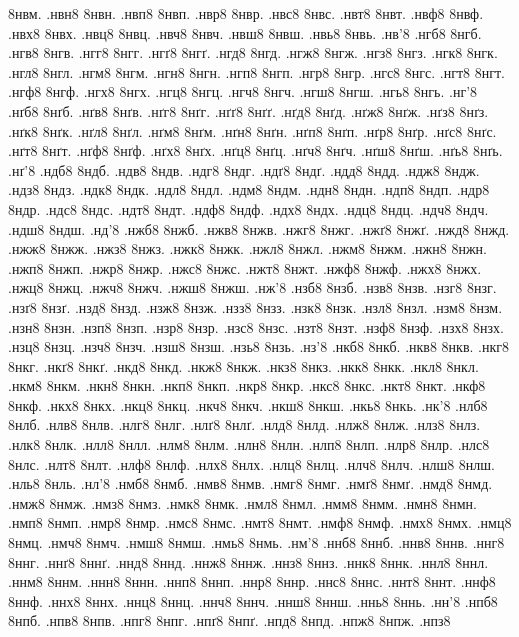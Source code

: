 {8нвм.
.нвн8
8нвн.
.нвп8
8нвп.
.нвр8
8нвр.
.нвс8
8нвс.
.нвт8
8нвт.
.нвф8
8нвф.
.нвх8
8нвх.
.нвц8
8нвц.
.нвч8
8нвч.
.нвш8
8нвш.
.нвь8
8нвь.
.нв'8
.нгб8
8нгб.
.нгв8
8нгв.
.нгг8
8нгг.
.нгґ8
8нгґ.
.нгд8
8нгд.
.нгж8
8нгж.
.нгз8
8нгз.
.нгк8
8нгк.
.нгл8
8нгл.
.нгм8
8нгм.
.нгн8
8нгн.
.нгп8
8нгп.
.нгр8
8нгр.
.нгс8
8нгс.
.нгт8
8нгт.
.нгф8
8нгф.
.нгх8
8нгх.
.нгц8
8нгц.
.нгч8
8нгч.
.нгш8
8нгш.
.нгь8
8нгь.
.нг'8
.нґб8
8нґб.
.нґв8
8нґв.
.нґг8
8нґг.
.нґґ8
8нґґ.
.нґд8
8нґд.
.нґж8
8нґж.
.нґз8
8нґз.
.нґк8
8нґк.
.нґл8
8нґл.
.нґм8
8нґм.
.нґн8
8нґн.
.нґп8
8нґп.
.нґр8
8нґр.
.нґс8
8нґс.
.нґт8
8нґт.
.нґф8
8нґф.
.нґх8
8нґх.
.нґц8
8нґц.
.нґч8
8нґч.
.нґш8
8нґш.
.нґь8
8нґь.
.нґ'8
.ндб8
8ндб.
.ндв8
8ндв.
.ндг8
8ндг.
.ндґ8
8ндґ.
.ндд8
8ндд.
.ндж8
8ндж.
.ндз8
8ндз.
.ндк8
8ндк.
.ндл8
8ндл.
.ндм8
8ндм.
.ндн8
8ндн.
.ндп8
8ндп.
.ндр8
8ндр.
.ндс8
8ндс.
.ндт8
8ндт.
.ндф8
8ндф.
.ндх8
8ндх.
.ндц8
8ндц.
.ндч8
8ндч.
.ндш8
8ндш.
.нд'8
.нжб8
8нжб.
.нжв8
8нжв.
.нжг8
8нжг.
.нжґ8
8нжґ.
.нжд8
8нжд.
.нжж8
8нжж.
.нжз8
8нжз.
.нжк8
8нжк.
.нжл8
8нжл.
.нжм8
8нжм.
.нжн8
8нжн.
.нжп8
8нжп.
.нжр8
8нжр.
.нжс8
8нжс.
.нжт8
8нжт.
.нжф8
8нжф.
.нжх8
8нжх.
.нжц8
8нжц.
.нжч8
8нжч.
.нжш8
8нжш.
.нж'8
.нзб8
8нзб.
.нзв8
8нзв.
.нзг8
8нзг.
.нзґ8
8нзґ.
.нзд8
8нзд.
.нзж8
8нзж.
.нзз8
8нзз.
.нзк8
8нзк.
.нзл8
8нзл.
.нзм8
8нзм.
.нзн8
8нзн.
.нзп8
8нзп.
.нзр8
8нзр.
.нзс8
8нзс.
.нзт8
8нзт.
.нзф8
8нзф.
.нзх8
8нзх.
.нзц8
8нзц.
.нзч8
8нзч.
.нзш8
8нзш.
.нзь8
8нзь.
.нз'8
.нкб8
8нкб.
.нкв8
8нкв.
.нкг8
8нкг.
.нкґ8
8нкґ.
.нкд8
8нкд.
.нкж8
8нкж.
.нкз8
8нкз.
.нкк8
8нкк.
.нкл8
8нкл.
.нкм8
8нкм.
.нкн8
8нкн.
.нкп8
8нкп.
.нкр8
8нкр.
.нкс8
8нкс.
.нкт8
8нкт.
.нкф8
8нкф.
.нкх8
8нкх.
.нкц8
8нкц.
.нкч8
8нкч.
.нкш8
8нкш.
.нкь8
8нкь.
.нк'8
.нлб8
8нлб.
.нлв8
8нлв.
.нлг8
8нлг.
.нлґ8
8нлґ.
.нлд8
8нлд.
.нлж8
8нлж.
.нлз8
8нлз.
.нлк8
8нлк.
.нлл8
8нлл.
.нлм8
8нлм.
.нлн8
8нлн.
.нлп8
8нлп.
.нлр8
8нлр.
.нлс8
8нлс.
.нлт8
8нлт.
.нлф8
8нлф.
.нлх8
8нлх.
.нлц8
8нлц.
.нлч8
8нлч.
.нлш8
8нлш.
.нль8
8нль.
.нл'8
.нмб8
8нмб.
.нмв8
8нмв.
.нмг8
8нмг.
.нмґ8
8нмґ.
.нмд8
8нмд.
.нмж8
8нмж.
.нмз8
8нмз.
.нмк8
8нмк.
.нмл8
8нмл.
.нмм8
8нмм.
.нмн8
8нмн.
.нмп8
8нмп.
.нмр8
8нмр.
.нмс8
8нмс.
.нмт8
8нмт.
.нмф8
8нмф.
.нмх8
8нмх.
.нмц8
8нмц.
.нмч8
8нмч.
.нмш8
8нмш.
.нмь8
8нмь.
.нм'8
.ннб8
8ннб.
.ннв8
8ннв.
.ннг8
8ннг.
.ннґ8
8ннґ.
.ннд8
8ннд.
.ннж8
8ннж.
.ннз8
8ннз.
.ннк8
8ннк.
.ннл8
8ннл.
.ннм8
8ннм.
.ннн8
8ннн.
.ннп8
8ннп.
.ннр8
8ннр.
.ннс8
8ннс.
.ннт8
8ннт.
.ннф8
8ннф.
.ннх8
8ннх.
.ннц8
8ннц.
.ннч8
8ннч.
.ннш8
8ннш.
.ннь8
8ннь.
.нн'8
.нпб8
8нпб.
.нпв8
8нпв.
.нпг8
8нпг.
.нпґ8
8нпґ.
.нпд8
8нпд.
.нпж8
8нпж.
.нпз8
}
